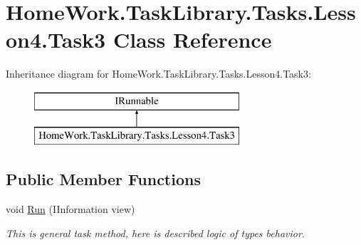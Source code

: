 \hypertarget{class_home_work_1_1_task_library_1_1_tasks_1_1_lesson4_1_1_task3}{}\section{Home\+Work.\+Task\+Library.\+Tasks.\+Lesson4.\+Task3 Class Reference}
\label{class_home_work_1_1_task_library_1_1_tasks_1_1_lesson4_1_1_task3}
Inheritance diagram for Home\+Work.\+Task\+Library.\+Tasks.\+Lesson4.\+Task3\+:\begin{figure}[H]
\begin{center}
\leavevmode
\includegraphics[height=2.000000cm]{class_home_work_1_1_task_library_1_1_tasks_1_1_lesson4_1_1_task3}
\end{center}
\end{figure}
\subsection*{Public Member Functions}
\begin{DoxyCompactItemize}
\item 
void \mbox{\hyperlink{class_home_work_1_1_task_library_1_1_tasks_1_1_lesson4_1_1_task3_acb762facf6fac2e51dbda523daffd971}{Run}} (I\+Information view)
\begin{DoxyCompactList}\small\item\em This is general task method, here is described logic of types behavior. \end{DoxyCompactList}\end{DoxyCompactItemize}
